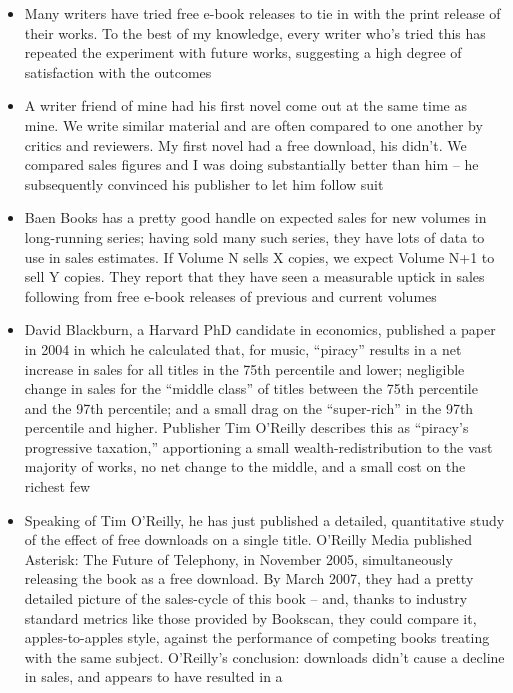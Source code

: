 \begin{itemize}
\item
  Many writers have tried free e-book releases to tie in with the
  print release of their works. To the best of my knowledge, every
  writer who's tried this has repeated the experiment with future
  works, suggesting a high degree of satisfaction with the outcomes
\item
  A writer friend of mine had his first novel come out at the same
  time as mine. We write similar material and are often compared to
  one another by critics and reviewers. My first novel had a free
  download, his didn't. We compared sales figures and I was doing
  substantially better than him -- he subsequently convinced his
  publisher to let him follow suit
\item
  Baen Books has a pretty good handle on expected sales for new
  volumes in long-running series; having sold many such series, they
  have lots of data to use in sales estimates. If Volume N sells X
  copies, we expect Volume N+1 to sell Y copies. They report that
  they have seen a measurable uptick in sales following from free
  e-book releases of previous and current volumes
\item
  David Blackburn, a Harvard PhD candidate in economics, published a
  paper in 2004 in which he calculated that, for music, ``piracy''
  results in a net increase in sales for all titles in the 75th
  percentile and lower; negligible change in sales for the ``middle
  class'' of titles between the 75th percentile and the 97th
  percentile; and a small drag on the ``super-rich'' in the 97th
  percentile and higher. Publisher Tim O'Reilly describes this as
  ``piracy's progressive taxation,'' apportioning a small
  wealth-redistribution to the vast majority of works, no net change
  to the middle, and a small cost on the richest few
\item
  Speaking of Tim O'Reilly, he has just published a detailed,
  quantitative study of the effect of free downloads on a single
  title. O'Reilly Media published Asterisk: The Future of Telephony,
  in November 2005, simultaneously releasing the book as a free
  download. By March 2007, they had a pretty detailed picture of the
  sales-cycle of this book -- and, thanks to industry standard
  metrics like those provided by Bookscan, they could compare it,
  apples-to-apples style, against the performance of competing books
  treating with the same subject. O'Reilly's conclusion: downloads
  didn't cause a decline in sales, and appears to have resulted in a

\end{itemize}
